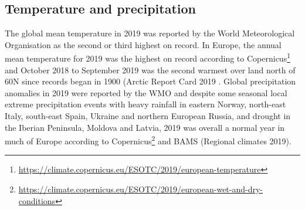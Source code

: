 \subsection{Temperature and precipitation}
The global mean temperature in 2019 was reported by the World Meteorological Organisation \citep{WMO1248:2020} as the second or third highest on record. In Europe, the annual mean temperature for 2019 was the highest on record according to Copernicus\footnote{\url{https://climate.copernicus.eu/ESOTC/2019/european-temperature}} and October 2018 to September 2019 was the second warmest over land north of 60\degrees N since records began in 1900 (Arctic Report Card 2019 \citep{Overland:ARC2019}.
Global precipitation anomalies in 2019 were reported by the WMO \citep{WMO1248:2020} and despite some seasonal local extreme precipitation events with heavy rainfall in eastern Norway, north-east Italy, south-east Spain, Ukraine and northern European Russia, and drought in the Iberian Peninsula, Moldova and Latvia, 2019 was overall a normal year in much of Europe according to Copernicus\footnote{\url{https://climate.copernicus.eu/ESOTC/2019/european-wet-and-dry-conditions}} and BAMS (Regional climates 2019).

